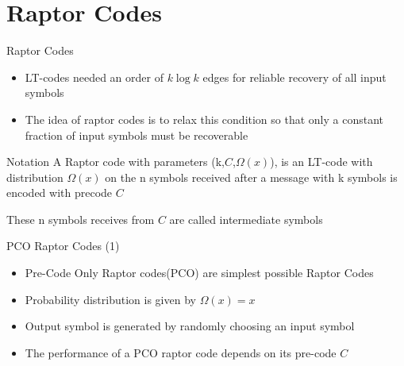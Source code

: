 \documentclass[handout,11pt]{beamer}
\begin{document}
\section{Raptor Codes}
\begin{frame}{Raptor Codes}
\begin{itemize}
\item LT-codes needed an order of $k\log k$ edges for reliable recovery of all input symbols 
\item The idea of raptor codes is to relax this condition so that only a constant fraction of input symbols must be recoverable
\end{itemize}

\begin{block}{Notation}
A Raptor code with parameters (k,$C$,$\Omega(x)$), is an LT-code with distribution $\Omega(x)$ on the n symbols received after a message with k symbols is encoded with precode $C$
\end{block}

These n symbols receives from $C$ are called intermediate symbols

\end{frame}
\begin{frame}{PCO Raptor Codes (1)}
\begin{itemize}
\item Pre-Code Only Raptor codes(PCO) are simplest possible Raptor Codes
\item Probability distribution is given by $\Omega(x) =x$
\item Output symbol is generated by randomly choosing an input symbol
\item The performance of a PCO raptor code depends on its pre-code $C$
\end{itemize}
\end{frame}
\end{document}
